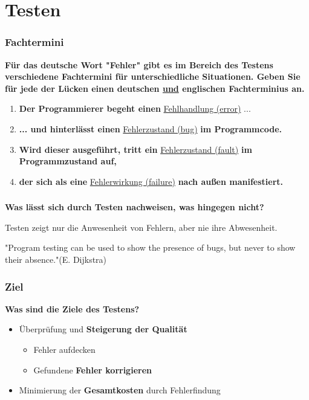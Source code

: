 \part{Testen}
\section{Fachtermini}
\textbf{Für das deutsche Wort "Fehler" gibt es im Bereich des Testens verschiedene Fachtermini für unterschiedliche Situationen. Geben Sie für jede der Lücken einen deutschen \underline{und} englischen Fachterminius an.}
\begin{enumerate}
    \item \textbf{Der Programmierer begeht einen} \underline{Fehlhandlung (error)} ...
    \item \textbf{... und hinterlässt einen} \underline{Fehlerzustand (bug)} \textbf{im Programmcode.}
    \item \textbf{Wird dieser ausgeführt, tritt ein} \underline{Fehlerzustand (fault)} \textbf{im Programmzustand auf,}
    \item \textbf{der sich als eine} \underline{Fehlerwirkung (failure)} \textbf{nach au\ss en manifestiert.}
\end{enumerate}

\section{}
\textbf{Was lässt sich durch Testen nachweisen, was hingegen nicht?}

Testen zeigt nur die Anwesenheit von Fehlern, aber nie ihre Abwesenheit.

"Program testing can be used to show the presence of bugs, but never to show their absence."(E. Dijkstra)
\section{Ziel}
\textbf{Was sind die Ziele des Testens?}
\begin{itemize}
    \item Überprüfung und \textbf{Steigerung der Qualität}\begin{itemize}
              \item Fehler aufdecken
              \item Gefundene \textbf{Fehler korrigieren}
          \end{itemize}
    \item Minimierung der \textbf{Gesamtkosten} durch Fehlerfindung
\end{itemize}

